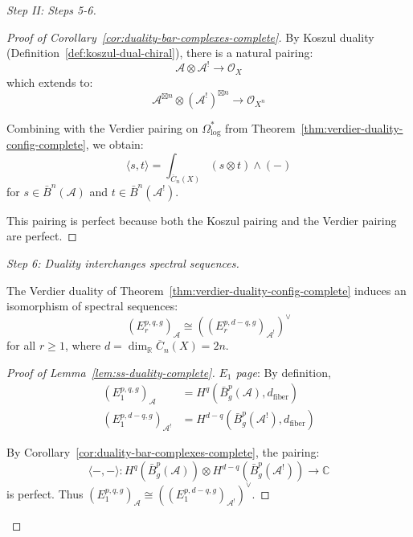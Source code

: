 \begin{proof}[Step II: Steps 5-6]
\begin{proof}[Proof of Corollary~\ref{cor:duality-bar-complexes-complete}]
By Koszul duality (Definition~\ref{def:koszul-dual-chiral}), there is a natural pairing:
\begin{equation}
\mathcal{A} \otimes \mathcal{A}^! \to \mathcal{O}_X
\end{equation}
which extends to:
\begin{equation}
\mathcal{A}^{\boxtimes n} \otimes (\mathcal{A}^!)^{\boxtimes n} \to \mathcal{O}_{X^n}
\end{equation}

Combining with the Verdier pairing on $\Omega^*_{\log}$ from Theorem~\ref{thm:verdier-duality-config-complete}, we obtain:
\begin{equation}
\langle s, t \rangle = \int_{\overline{C}_n(X)} (s \otimes t) \wedge (-)
\end{equation}
for $s \in \bar{B}^n(\mathcal{A})$ and $t \in \bar{B}^n(\mathcal{A}^!)$.

This pairing is perfect because both the Koszul pairing and the Verdier pairing are 
perfect.
\end{proof}

\emph{Step 6: Duality interchanges spectral sequences.}

\begin{lemma}
\label{lem:ss-duality-complete}
The Verdier duality of Theorem~\ref{thm:verdier-duality-config-complete} induces an isomorphism 
of spectral sequences:
\begin{equation}
(E_r^{p,q,g})_{\mathcal{A}} \cong ((E_r^{p,d-q,g})_{\mathcal{A}^!})^\vee
\end{equation}
for all $r \geq 1$, where $d = \dim_{\mathbb{R}} \overline{C}_n(X) = 2n$.
\end{lemma}

\begin{proof}[Proof of Lemma~\ref{lem:ss-duality-complete}]
\emph{$E_1$ page}: By definition,
\begin{align}
(E_1^{p,q,g})_{\mathcal{A}} &= H^q(\bar{B}^p_g(\mathcal{A}), d_{\text{fiber}})\\
(E_1^{p,d-q,g})_{\mathcal{A}^!} &= H^{d-q}(\bar{B}^p_g(\mathcal{A}^!), d_{\text{fiber}})
\end{align}

By Corollary~\ref{cor:duality-bar-complexes-complete}, the pairing:
\begin{equation}
\langle -, - \rangle: H^q(\bar{B}^p_g(\mathcal{A})) \otimes H^{d-q}(\bar{B}^p_g(
\mathcal{A}^!)) \to \mathbb{C}
\end{equation}
is perfect. Thus $(E_1^{p,q,g})_{\mathcal{A}} \cong ((E_1^{p,d-q,g})_{\mathcal{A}^!})^\vee$.


\end{proof}
\end{proof}
